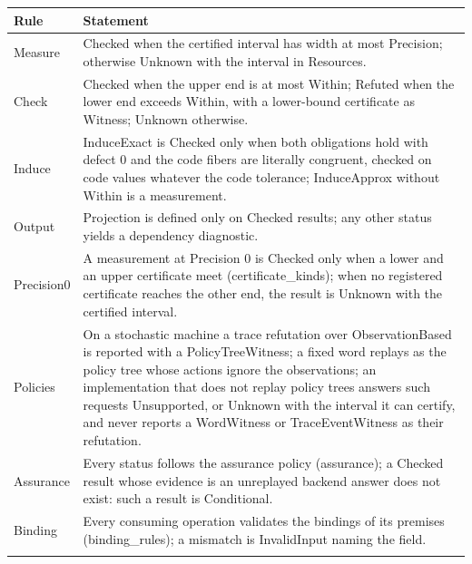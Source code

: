 \documentclass[11pt]{article}
\theoremstyle{definition}
\theoremstyle{plain}
\begin{document}
{\footnotesize\begin{longtable}{>{\raggedright\arraybackslash}p{3.0cm}>{\raggedright\arraybackslash}p{11.4cm}}
\toprule Rule & Statement\\ \midrule \endhead
Measure & Checked when the certified interval has width at most Precision; otherwise Unknown with the interval in Resources.\\ \addlinespace[3pt]
Check & Checked when the upper end is at most Within; Refuted when the lower end exceeds Within,\allowbreak{} with a lower-bound certificate as Witness; Unknown otherwise.\\ \addlinespace[3pt]
Induce & InduceExact is Checked only when both obligations hold with defect 0 and the code fibers are literally congruent,\allowbreak{} checked on code values whatever the code tolerance; InduceApprox without Within is a measurement.\\ \addlinespace[3pt]
Output & Projection is defined only on Checked results; any other status yields a dependency diagnostic.\\ \addlinespace[3pt]
Precision0 & A measurement at Precision 0 is Checked only when a lower and an upper certificate meet (certificate\_kinds); when no registered certificate reaches the other end,\allowbreak{} the result is Unknown with the certified interval.\\ \addlinespace[3pt]
Policies & On a stochastic machine a trace refutation over ObservationBased is reported with a PolicyTreeWitness; a fixed word replays as the policy tree whose actions ignore the observations; an implementation that does not replay policy trees answers such requests Unsupported,\allowbreak{} or Unknown with the interval it can certify,\allowbreak{} and never reports a WordWitness or TraceEventWitness as their refutation.\\ \addlinespace[3pt]
Assurance & Every status follows the assurance policy (assurance); a Checked result whose evidence is an unreplayed backend answer does not exist: such a result is Conditional.\\ \addlinespace[3pt]
Binding & Every consuming operation validates the bindings of its premises (binding\_rules); a mismatch is InvalidInput naming the field.\\ \addlinespace[3pt]
\bottomrule\end{longtable}}
\end{document}
